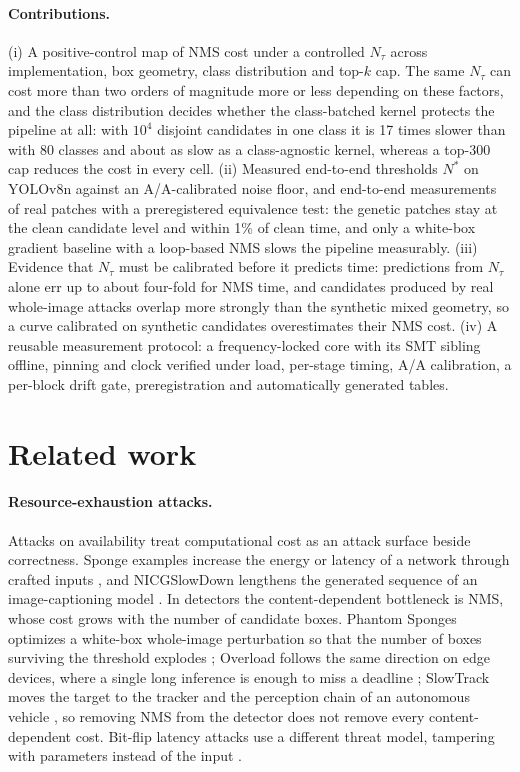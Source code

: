\documentclass[a4paper,fleqn]{cas-dc}
\newcommand{\Ntau}{N_{\tau}}
\begin{document}
\paragraph{Contributions.}
(i) A positive-control map of NMS cost under a controlled $\Ntau$ across implementation, box geometry, class distribution and top-$k$ cap. The same $\Ntau$ can cost more than two orders of magnitude more or less depending on these factors, and the class distribution decides whether the class-batched kernel protects the pipeline at all: with $10^4$ disjoint candidates in one class it is 17 times slower than with 80 classes and about as slow as a class-agnostic kernel, whereas a top-300 cap reduces the cost in every cell. (ii) Measured end-to-end thresholds $N^{*}$ on YOLOv8n against an A/A-calibrated noise floor, and end-to-end measurements of real patches with a preregistered equivalence test: the genetic patches stay at the clean candidate level and within 1\% of clean time, and only a white-box gradient baseline with a loop-based NMS slows the pipeline measurably. (iii) Evidence that $\Ntau$ must be calibrated before it predicts time: predictions from $\Ntau$ alone err up to about four-fold for NMS time, and candidates produced by real whole-image attacks overlap more strongly than the synthetic mixed geometry, so a curve calibrated on synthetic candidates overestimates their NMS cost. (iv) A reusable measurement protocol: a frequency-locked core with its SMT sibling offline, pinning and clock verified under load, per-stage timing, A/A calibration, a per-block drift gate, preregistration and automatically generated tables.

\section{Related work}
\label{sec:related}
\paragraph{Resource-exhaustion attacks.}
Attacks on availability treat computational cost as an attack surface beside correctness. Sponge examples increase the energy or latency of a network through crafted inputs \cite{shumailov2021sponge}, and NICGSlowDown lengthens the generated sequence of an image-captioning model \cite{nicgslowdown2022}. In detectors the content-dependent bottleneck is NMS, whose cost grows with the number of candidate boxes. Phantom Sponges optimizes a white-box whole-image perturbation so that the number of boxes surviving the threshold explodes \cite{phantom2023}; Overload follows the same direction on edge devices, where a single long inference is enough to miss a deadline \cite{overload2024}; SlowTrack moves the target to the tracker and the perception chain of an autonomous vehicle \cite{slowtrack2024}, so removing NMS from the detector does not remove every content-dependent cost. Bit-flip latency attacks use a different threat model, tampering with parameters instead of the input \cite{bitflip2025}.
\end{document}
